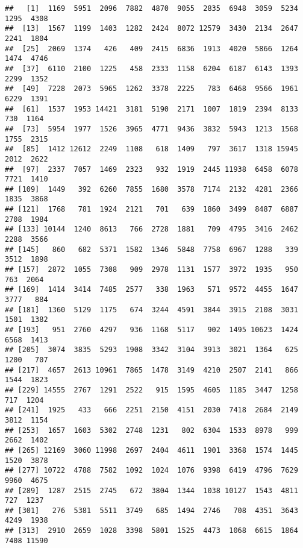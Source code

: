 \documentclass[
]{article}
\newenvironment{Shaded}{\begin{snugshade}}{\end{snugshade}}
\newcommand{\FunctionTok}[1]{\textcolor[rgb]{0.00,0.00,0.00}{#1}}
\newcommand{\NormalTok}[1]{#1}
\newcommand{\SpecialCharTok}[1]{\textcolor[rgb]{0.00,0.00,0.00}{#1}}
\begin{document}
\begin{Shaded}
\end{Shaded}

\begin{verbatim}
##   [1]  1169  5951  2096  7882  4870  9055  2835  6948  3059  5234  1295  4308
##  [13]  1567  1199  1403  1282  2424  8072 12579  3430  2134  2647  2241  1804
##  [25]  2069  1374   426   409  2415  6836  1913  4020  5866  1264  1474  4746
##  [37]  6110  2100  1225   458  2333  1158  6204  6187  6143  1393  2299  1352
##  [49]  7228  2073  5965  1262  3378  2225   783  6468  9566  1961  6229  1391
##  [61]  1537  1953 14421  3181  5190  2171  1007  1819  2394  8133   730  1164
##  [73]  5954  1977  1526  3965  4771  9436  3832  5943  1213  1568  1755  2315
##  [85]  1412 12612  2249  1108   618  1409   797  3617  1318 15945  2012  2622
##  [97]  2337  7057  1469  2323   932  1919  2445 11938  6458  6078  7721  1410
## [109]  1449   392  6260  7855  1680  3578  7174  2132  4281  2366  1835  3868
## [121]  1768   781  1924  2121   701   639  1860  3499  8487  6887  2708  1984
## [133] 10144  1240  8613   766  2728  1881   709  4795  3416  2462  2288  3566
## [145]   860   682  5371  1582  1346  5848  7758  6967  1288   339  3512  1898
## [157]  2872  1055  7308   909  2978  1131  1577  3972  1935   950   763  2064
## [169]  1414  3414  7485  2577   338  1963   571  9572  4455  1647  3777   884
## [181]  1360  5129  1175   674  3244  4591  3844  3915  2108  3031  1501  1382
## [193]   951  2760  4297   936  1168  5117   902  1495 10623  1424  6568  1413
## [205]  3074  3835  5293  1908  3342  3104  3913  3021  1364   625  1200   707
## [217]  4657  2613 10961  7865  1478  3149  4210  2507  2141   866  1544  1823
## [229] 14555  2767  1291  2522   915  1595  4605  1185  3447  1258   717  1204
## [241]  1925   433   666  2251  2150  4151  2030  7418  2684  2149  3812  1154
## [253]  1657  1603  5302  2748  1231   802  6304  1533  8978   999  2662  1402
## [265] 12169  3060 11998  2697  2404  4611  1901  3368  1574  1445  1520  3878
## [277] 10722  4788  7582  1092  1024  1076  9398  6419  4796  7629  9960  4675
## [289]  1287  2515  2745   672  3804  1344  1038 10127  1543  4811   727  1237
## [301]   276  5381  5511  3749   685  1494  2746   708  4351  3643  4249  1938
## [313]  2910  2659  1028  3398  5801  1525  4473  1068  6615  1864  7408 11590

\end{verbatim}
\end{document}

